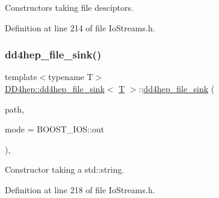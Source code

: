 Constructors taking file desciptors. 



Definition at line 214 of file Io\+Streams.\+h.

\hypertarget{class_d_d4hep_1_1dd4hep__file__sink_a9a5a2c30b5fed19f85593ccc16349e96}{}\label{class_d_d4hep_1_1dd4hep__file__sink_a9a5a2c30b5fed19f85593ccc16349e96} 
\subsubsection{\texorpdfstring{dd4hep\+\_\+file\+\_\+sink()}{dd4hep\_file\_sink()}\hspace{0.1cm}{\footnotesize\ttfamily [4/6]}}
{\footnotesize\ttfamily template$<$typename T$>$ \\
\hyperlink{class_d_d4hep_1_1dd4hep__file__sink}{D\+D4hep\+::dd4hep\+\_\+file\+\_\+sink}$<$ \hyperlink{class_t}{T} $>$\+::\hyperlink{class_d_d4hep_1_1dd4hep__file__sink}{dd4hep\+\_\+file\+\_\+sink} (\begin{DoxyParamCaption}\item[{const std\+::string \&}]{path,  }\item[{B\+O\+O\+S\+T\+\_\+\+I\+O\+S\+::openmode}]{mode = {\ttfamily BOOST\+\_\+IOS\+:\+:out} }\end{DoxyParamCaption})\hspace{0.3cm}{\ttfamily [inline]}, {\ttfamily [explicit]}}



Constructor taking a std\+::string. 



Definition at line 218 of file Io\+Streams.\+h.

\hypertarget{class_d_d4hep_1_1dd4hep__file__sink_aae006859555f5fe1ee2d834358476273}{}\label{class_d_d4hep_1_1dd4hep__file__sink_aae006859555f5fe1ee2d834358476273} 
